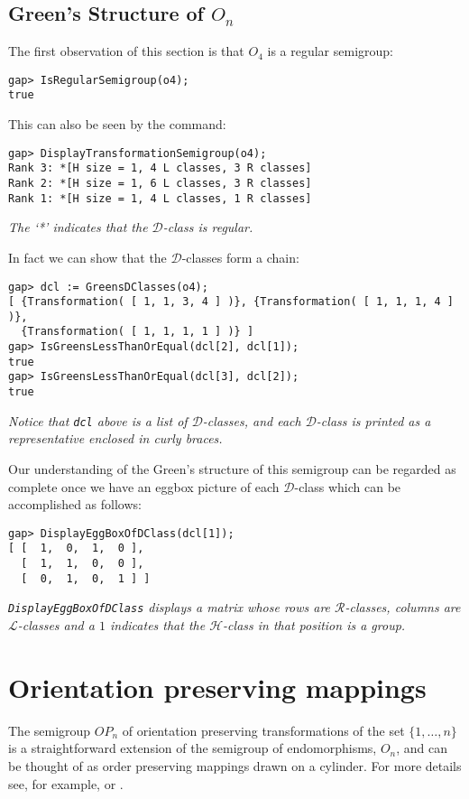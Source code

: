 \documentclass[12pt]{article}
\theoremstyle{plain} \newtheorem{Thm}{Theorem}
\theoremstyle{plain} \newtheorem{Cor}{Corollary}
\theoremstyle{plain} \newtheorem{Lemma}{Lemma}
\theoremstyle{plain} \newtheorem{Prop}{Proposition}
\theoremstyle{plain} \newtheorem{Ex}{Exercise}
\def\d{${\mathcal{D}}$}
\def\l{${\mathcal{L}}$}
\def\r{${\mathcal{R}}$}
\def\h{${\mathcal{H}}$}
\begin{document}
\subsection{Green's Structure of $O_n$}
The first observation of this section is that $O_4$ is a regular semigroup:
\begin{verbatim}
gap> IsRegularSemigroup(o4);
true
\end{verbatim}
This can also be seen by the command:
\begin{verbatim}
gap> DisplayTransformationSemigroup(o4);
Rank 3: *[H size = 1, 4 L classes, 3 R classes]
Rank 2: *[H size = 1, 6 L classes, 3 R classes]
Rank 1: *[H size = 1, 4 L classes, 1 R classes]
\end{verbatim}
{\em The `*' indicates that the {\d}-class is regular.}

In fact we can show that the {\d}-classes form a chain:
\begin{verbatim}
gap> dcl := GreensDClasses(o4);
[ {Transformation( [ 1, 1, 3, 4 ] )}, {Transformation( [ 1, 1, 1, 4 ] )}, 
  {Transformation( [ 1, 1, 1, 1 ] )} ]
gap> IsGreensLessThanOrEqual(dcl[2], dcl[1]);
true
gap> IsGreensLessThanOrEqual(dcl[3], dcl[2]);
true
\end{verbatim}
{\em Notice that {\tt dcl} above is a list of \d-classes, and each
\d-class is printed as a representative enclosed in curly braces.}

Our understanding of the Green's structure of this semigroup 
can be regarded as complete once we have an eggbox picture of 
each \d-class which can be accomplished as follows:
\begin{verbatim}
gap> DisplayEggBoxOfDClass(dcl[1]);
[ [  1,  0,  1,  0 ],
  [  1,  1,  0,  0 ],
  [  0,  1,  0,  1 ] ]
\end{verbatim}
{\em {\tt DisplayEggBoxOfDClass} displays a matrix whose rows are
{\r}-classes, columns are {\l}-classes and a $1$ indicates that the
{\h}-class in that position is a group.}

\section{Orientation preserving mappings}
The semigroup $OP_n$ of orientation preserving transformations
of the set $\{1, \ldots, n\}$
is a straightforward extension of the semigroup of endomorphisms,
$O_n$, and can be thought
of as order preserving mappings drawn on a cylinder. For more details see,
for example, \cite{arthur_opn?} or \cite{cathig_opn}.
\end{document}
